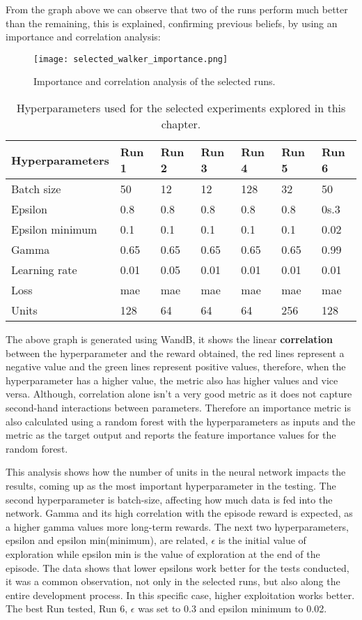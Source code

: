 From the graph above we can observe that two of the runs perform much better than the remaining, this is explained, confirming previous beliefs, by using an importance and correlation analysis:
\begin{figure}[H]
 \centering
 \texttt{[image: selected\_walker\_importance.png]}
 \caption{Importance and correlation analysis of the selected runs.}
\end{figure}

\begin{table}[H]
 \centering
 \caption{Hyperparameters used for the selected experiments explored in this chapter.}
 \begin{tabular}{|l|l|l|l|l|l|l|}
 \hline
 Hyperparameters & Run 1 & Run 2 & Run 3 & Run 4 & Run 5 & Run 6 \\ \hline
 Batch size & 50 & 12 & 12 & 128 & 32 & 50 \\ \hline
 Epsilon & 0.8 & 0.8 & 0.8 & 0.8 & 0.8 & 0s.3 \\ \hline
 Epsilon minimum & 0.1 & 0.1 & 0.1 & 0.1 & 0.1 & 0.02 \\ \hline
 Gamma & 0.65 & 0.65 & 0.65 & 0.65 & 0.65 & 0.99 \\ \hline
 Learning rate & 0.01 & 0.05 & 0.01 & 0.01 & 0.01 & 0.01 \\ \hline
 Loss & mae & mae & mae & mae & mae & mae \\ \hline
 Units & 128 & 64 & 64 & 64 & 256 & 128 \\ \hline
 \end{tabular}
 \end{table}

The above graph is generated using WandB, it shows the linear \textbf{correlation} between the hyperparameter and the reward obtained, the red lines represent a negative value and the green lines represent positive values, therefore, when the hyperparameter has a higher value, the metric also has higher values and vice versa. Although, correlation alone isn't a very good metric as it does not capture second-hand interactions between parameters.\cite{parameterimportance}
Therefore an importance metric is also calculated using a random forest with the hyperparameters as inputs and the metric as the target output and reports the feature importance values for the random forest.

This analysis shows how the number of units in the neural network impacts the results, coming up as the most important hyperparameter in the testing. The second hyperparameter is batch-size, affecting how much data is fed into the network. Gamma and its high correlation with the episode reward is expected, as a higher gamma values more long-term rewards. The next two hyperparameters, epsilon and epsilon min(minimum), are related, $\epsilon$ is the initial value of exploration while epsilon min is the value of exploration at the end of the episode. The data shows that lower epsilons work better for the tests conducted, it was a common observation, not only in the selected runs, but also along the entire development process. 
In this specific case, higher exploitation works better. The best Run tested, Run 6, $\epsilon$ was set to 0.3 and epsilon minimum to 0.02.
